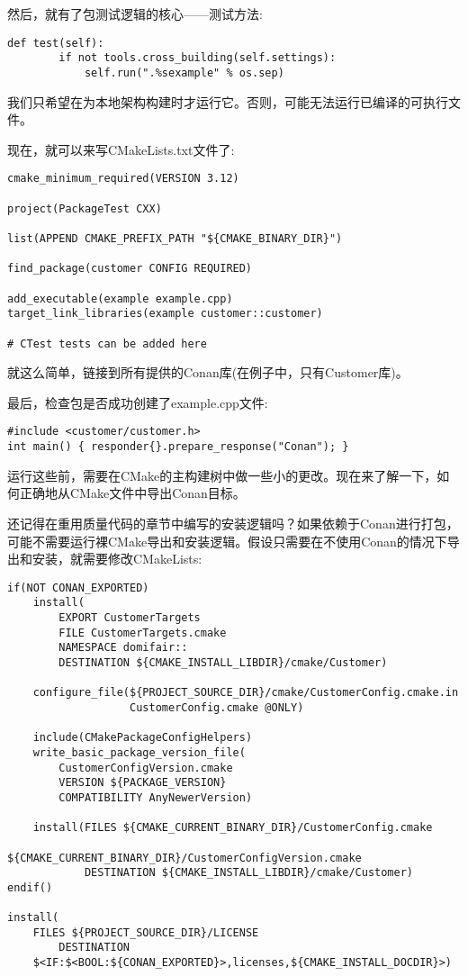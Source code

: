 然后，就有了包测试逻辑的核心——测试方法:

\begin{lstlisting}[style=stylePython]
	def test(self):
		if not tools.cross_building(self.settings):
			self.run(".%sexample" % os.sep)
\end{lstlisting}

我们只希望在为本地架构构建时才运行它。否则，可能无法运行已编译的可执行文件。

现在，就可以来写CMakeLists.txt文件了:

\begin{lstlisting}[style=styleCMake]
cmake_minimum_required(VERSION 3.12)

project(PackageTest CXX)

list(APPEND CMAKE_PREFIX_PATH "${CMAKE_BINARY_DIR}")

find_package(customer CONFIG REQUIRED)

add_executable(example example.cpp)
target_link_libraries(example customer::customer)

# CTest tests can be added here
\end{lstlisting}

就这么简单，链接到所有提供的Conan库(在例子中，只有Customer库)。

最后，检查包是否成功创建了example.cpp文件:

\begin{lstlisting}[style=styleCXX]
#include <customer/customer.h>
int main() { responder{}.prepare_response("Conan"); }
\end{lstlisting}

运行这些前，需要在CMake的主构建树中做一些小的更改。现在来了解一下，如何正确地从CMake文件中导出Conan目标。 


还记得在重用质量代码的章节中编写的安装逻辑吗？如果依赖于Conan进行打包，可能不需要运行裸CMake导出和安装逻辑。假设只需要在不使用Conan的情况下导出和安装，就需要修改CMakeLists:

\begin{lstlisting}[style=styleCMake]
if(NOT CONAN_EXPORTED)
	install(
		EXPORT CustomerTargets
		FILE CustomerTargets.cmake
		NAMESPACE domifair::
		DESTINATION ${CMAKE_INSTALL_LIBDIR}/cmake/Customer)
	
	configure_file(${PROJECT_SOURCE_DIR}/cmake/CustomerConfig.cmake.in
				   CustomerConfig.cmake @ONLY)
	
	include(CMakePackageConfigHelpers)
	write_basic_package_version_file(
		CustomerConfigVersion.cmake
		VERSION ${PACKAGE_VERSION}
		COMPATIBILITY AnyNewerVersion)
	
	install(FILES ${CMAKE_CURRENT_BINARY_DIR}/CustomerConfig.cmake
				${CMAKE_CURRENT_BINARY_DIR}/CustomerConfigVersion.cmake
			DESTINATION ${CMAKE_INSTALL_LIBDIR}/cmake/Customer)
endif()

install(
	FILES ${PROJECT_SOURCE_DIR}/LICENSE
	 	DESTINATION
	$<IF:$<BOOL:${CONAN_EXPORTED}>,licenses,${CMAKE_INSTALL_DOCDIR}>)
\end{lstlisting}

